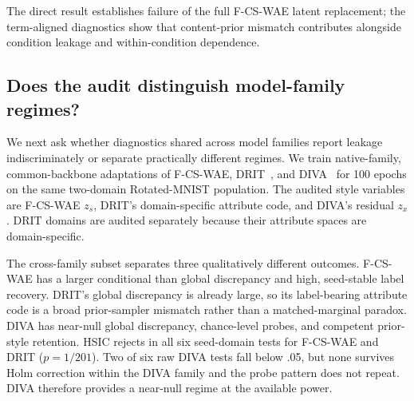 \documentclass{article}
\begin{document}
The direct result establishes failure of the full F-CS-WAE latent replacement;
the term-aligned diagnostics show that content-prior mismatch contributes
alongside condition leakage and within-condition dependence.
\FloatBarrier

\subsection{Does the audit distinguish model-family regimes?}
\label{sec:cross-model}

We next ask whether diagnostics shared across model families report leakage
indiscriminately or separate practically different regimes.  We train
native-family, common-backbone adaptations of F-CS-WAE,
DRIT~\citep{lee2018drit}, and DIVA~\citep{ilse2020diva} for 100 epochs on the
same two-domain Rotated-MNIST population.  The audited style variables are
F-CS-WAE $z_s$, DRIT's domain-specific attribute code, and DIVA's residual
$z_x$.  DRIT domains are audited separately because their attribute spaces
are domain-specific.

\begin{table}[H]
\caption{Cross-model audit on a common Rotated-MNIST backbone, mean $\pm$
sample standard deviation over three seeds.  Accuracies and retention are
percentages.  Raw MMD values describe the fixed audit geometry, not a
model-quality ranking; an unbiased estimate may be negative under its null.}
\label{tab:cross-model}
\centering
\scriptsize
\setlength{\tabcolsep}{3.2pt}
\end{table}

The cross-family subset separates three qualitatively different outcomes.
F-CS-WAE has a
larger conditional than global discrepancy and high, seed-stable label
recovery.  DRIT's global discrepancy is already large, so its label-bearing
attribute code is a broad prior-sampler mismatch rather than a
matched-marginal paradox.  DIVA has near-null global discrepancy, chance-level
probes, and competent prior-style retention.  HSIC rejects in all six
seed-domain tests for F-CS-WAE and DRIT ($p=1/201$).  Two of six raw DIVA tests
fall below .05, but none survives Holm correction within the DIVA family and
the probe pattern does not repeat.  DIVA therefore provides a near-null regime
at the available power.
\end{document}
